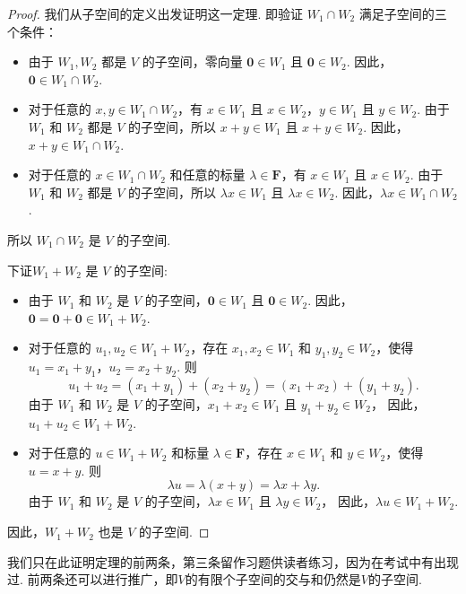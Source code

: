 \begin{proof}
    我们从子空间的定义出发证明这一定理.
    即验证 $W_1 \cap W_2$ 满足子空间的三个条件：

    \begin{itemize}
        \item
              由于 $W_1, W_2$ 都是 $V$ 的子空间，零向量 $\mathbf{0} \in W_1$ 且 $\mathbf{0} \in W_2$. 因此，$\mathbf{0} \in W_1 \cap W_2$.

        \item
              对于任意的 $x, y \in W_1 \cap W_2$，有 $x \in W_1$ 且 $x \in W_2$，$y \in W_1$ 且 $y \in W_2$.
              由于 $W_1$ 和 $W_2$ 都是 $V$ 的子空间，所以 $x + y \in W_1$ 且 $x + y \in W_2$.
              因此，$x + y \in W_1 \cap W_2$.

        \item
              对于任意的 $x \in W_1 \cap W_2$ 和任意的标量 $\lambda \in \mathbf{F}$，有 $x \in W_1$ 且 $x \in W_2$.
              由于 $W_1$ 和 $W_2$ 都是 $V$ 的子空间，所以 $\lambda x \in W_1$ 且 $\lambda x \in W_2$.
              因此，$\lambda x \in W_1 \cap W_2$.
    \end{itemize}

    所以 $W_1 \cap W_2$ 是 $V$ 的子空间.

    下证$W_1 + W_2$ 是 $V$ 的子空间:
    \begin{itemize}
        \item
              由于 $W_1$ 和 $W_2$ 是 $V$ 的子空间，$\mathbf{0} \in W_1$ 且 $\mathbf{0} \in W_2$.
              因此，$\mathbf{0} = \mathbf{0} + \mathbf{0} \in W_1 + W_2$.

        \item
              对于任意的 $u_1, u_2 \in W_1 + W_2$，存在 $x_1, x_2 \in W_1$ 和 $y_1, y_2 \in W_2$，使得 $u_1 = x_1 + y_1$，$u_2 = x_2 + y_2$.
              则
              \[
                  u_1 + u_2 = (x_1 + y_1) + (x_2 + y_2) = (x_1 + x_2) + (y_1 + y_2).
              \]
              由于 $W_1$ 和 $W_2$ 是 $V$ 的子空间，$x_1 + x_2 \in W_1$ 且 $y_1 + y_2 \in W_2$，
              因此，$u_1 + u_2 \in W_1 + W_2$.

        \item
              对于任意的 $u \in W_1 + W_2$ 和标量 $\lambda \in \mathbf{F}$，存在 $x \in W_1$ 和 $y \in W_2$，使得 $u = x + y$.
              则
              \[
                  \lambda u = \lambda (x + y) = \lambda x + \lambda y.
              \]
              由于 $W_1$ 和 $W_2$ 是 $V$ 的子空间，$\lambda x \in W_1$ 且 $\lambda y \in W_2$，
              因此，$\lambda u \in W_1 + W_2$.
    \end{itemize}

    因此，$W_1 + W_2$ 也是 $V$ 的子空间.
\end{proof}
我们只在此证明定理的前两条，第三条留作习题供读者练习，因为在考试中有出现过. 前两条还可以进行推广，即$V$的有限个子空间的交与和仍然是$V$的子空间.

